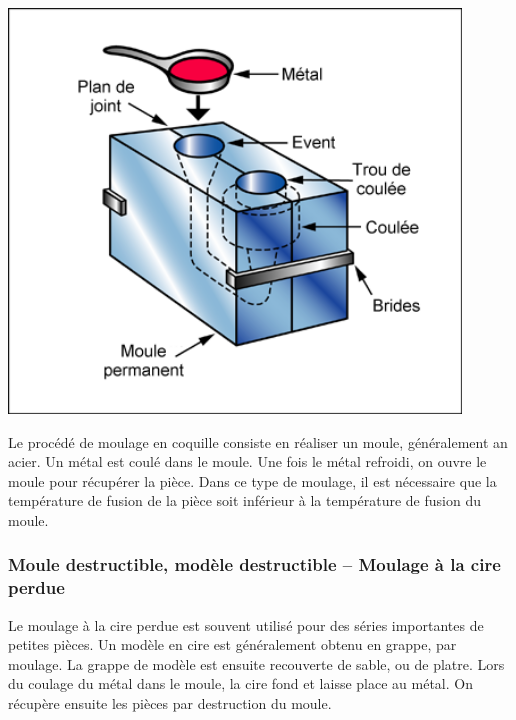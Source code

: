 \documentclass[11pt,oneside]{article}
\begin{document}
\begin{minipage}[c]{.3\linewidth}
\begin{center}
\includegraphics[width=0.9\textwidth]{png/moulage2}
\end{center}
\end{minipage}\hfill
\begin{minipage}[c]{.65\linewidth}
Le procédé de moulage en coquille consiste en réaliser un moule, généralement an acier. Un métal est coulé dans le moule. Une fois le métal refroidi, on ouvre le moule pour récupérer la pièce. Dans ce type de moulage, il est nécessaire que la température de fusion de la pièce soit inférieur à la température de fusion du moule. 
\end{minipage}

\subsubsection{Moule destructible, modèle destructible -- Moulage à la cire perdue}

Le moulage à la cire perdue est souvent utilisé pour des séries importantes de petites pièces.
Un modèle en cire est généralement obtenu en grappe, par moulage. La grappe de modèle est ensuite recouverte de sable, ou de platre. Lors du coulage du métal dans le moule, la cire fond et laisse place au métal. On récupère ensuite les pièces par destruction du moule.
\end{document}
